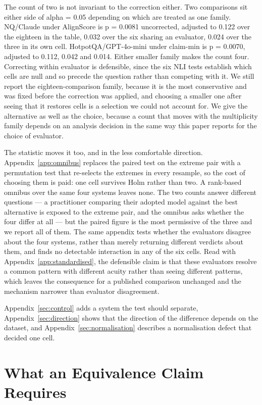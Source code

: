 \documentclass[11pt]{article}
\begin{document}
The count of two is not invariant to the correction either. Two comparisons sit either side of alpha = 0.05 depending on which are treated as one family. NQ/Claude under AlignScore is p = 0.0081 uncorrected, adjusted to 0.122 over the eighteen in the table, 0.032 over the six sharing an evaluator, 0.024 over the three in its own cell. HotpotQA/GPT-4o-mini under claim-min is p = 0.0070, adjusted to 0.112, 0.042 and 0.014. Either smaller family makes the count four. Correcting within evaluator is defensible, since the six NLI tests establish which cells are null and so precede the question rather than competing with it. We still report the eighteen-comparison family, because it is the most conservative and was fixed before the correction was applied, and choosing a smaller one after seeing that it restores cells is a selection we could not account for. We give the alternative as well as the choice, because a count that moves with the multiplicity family depends on an analysis decision in the same way this paper reports for the choice of evaluator.

The statistic moves it too, and in the less comfortable direction. Appendix~\ref{app:omnibus} replaces the paired test on the extreme pair with a permutation test that re-selects the extremes in every resample, so the cost of choosing them is paid: one cell survives Holm rather than two. A rank-based omnibus over the same four systems leaves none. The two counts answer different questions --- a practitioner comparing their adopted model against the best alternative is exposed to the extreme pair, and the omnibus asks whether the four differ at all --- but the paired figure is the most permissive of the three and we report all of them. The same appendix tests whether the evaluators disagree about the four systems, rather than merely returning different verdicts about them, and finds no detectable interaction in any of the six cells. Read with Appendix~\ref{app:standardised}, the defensible claim is that these evaluators resolve a common pattern with different acuity rather than seeing different patterns, which leaves the consequence for a published comparison unchanged and the mechanism narrower than evaluator disagreement.

Appendix~\ref{sec:control} adds a system the test should separate, Appendix~\ref{sec:direction} shows that the direction of the difference depends on the dataset, and Appendix~\ref{sec:normalisation} describes a normalisation defect that decided one cell.


\section{What an Equivalence Claim Requires}
\label{sec:equivalence}
\end{document}
